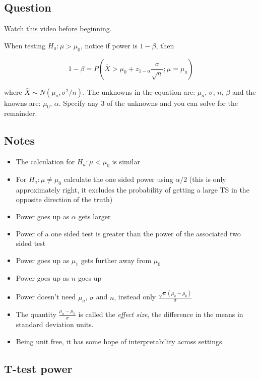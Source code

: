 \documentclass[]{article}
\begin{document}
\subsection{Question}\label{question}

\href{http://youtu.be/3bWhP5MyuqI?list=PLpl-gQkQivXiBmGyzLrUjzsblmQsLtkzJ}{Watch
this video before beginning.}

When testing $H_a : \mu > \mu_0$, notice if power is $1 - \beta$, then

\[1 - \beta = P\left(\bar X > \mu_0 + z_{1-\alpha} \frac{\sigma}{\sqrt{n}} ; \mu = \mu_a \right)\]

where $\bar X \sim N(\mu_a, \sigma^2 / n)$. The unknowns in the equation
are: $\mu_a$, $\sigma$, $n$, $\beta$ and the knowns are: $\mu_0$,
$\alpha$. Specify any 3 of the unknowns and you can solve for the
remainder.

\subsection{Notes}\label{notes}

\begin{itemize}
\itemsep1pt\parskip0pt
\item
  The calculation for $H_a:\mu < \mu_0$ is similar
\item
  For $H_a: \mu \neq \mu_0$ calculate the one sided power using
  $\alpha / 2$ (this is only approximately right, it excludes the
  probability of getting a large TS in the opposite direction of the
  truth)
\item
  Power goes up as $\alpha$ gets larger
\item
  Power of a one sided test is greater than the power of the associated
  two sided test
\item
  Power goes up as $\mu_1$ gets further away from $\mu_0$
\item
  Power goes up as $n$ goes up
\item
  Power doesn't need $\mu_a$, $\sigma$ and $n$, instead only
  $\frac{\sqrt{n}(\mu_a - \mu_0)}{\sigma}$
\item
  The quantity $\frac{\mu_a - \mu_0}{\sigma}$ is called the \emph{effect
  size}, the difference in the means in standard deviation units.
\item
  Being unit free, it has some hope of interpretability across settings.
\end{itemize}

\subsection{T-test power}\label{t-test-power}
\end{document}
